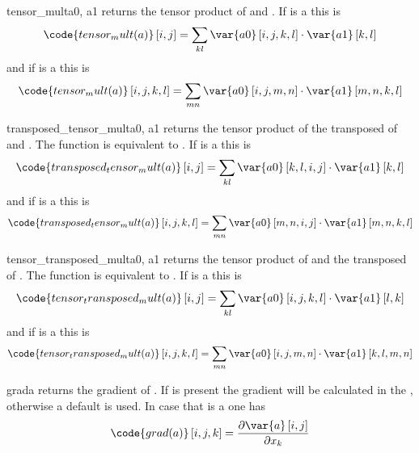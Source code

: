 \begin{funcdesc}{tensor_mult}{a0, a1}
returns the tensor product of  and .
If  is a \RankTwo this is
\begin{equation}
\code{tensor_mult(a)}\left[i,j\right]=\sum_{kl}\var{a0}\left[i,j,k,l\right] \cdot \var{a1} \left[k,l\right]
\end{equation}
and if  is a \RankFour this is
\begin{equation}
\code{tensor_mult(a)}\left[i,j,k,l\right]=\sum_{mn}\var{a0} \left[i,j,m,n\right] \cdot \var{a1} \left[m,n,k,l\right]
\end{equation}
\end{funcdesc}

\begin{funcdesc}{transposed_tensor_mult}{a0, a1}
returns the tensor product of the transposed of  and .
The function is equivalent to .
If  is a \RankTwo this is
\begin{equation}
\code{transposed_tensor_mult(a)}\left[i,j\right]=\sum_{kl}\var{a0}\left[k,l,i,j\right] \cdot \var{a1} \left[k,l\right]
\end{equation}
and if  is a \RankFour this is
\begin{equation}
\code{transposed_tensor_mult(a)}\left[i,j,k,l\right]=\sum_{mn}\var{a0} \left[m,n,i,j\right] \cdot \var{a1} \left[m,n,k,l\right]
\end{equation}
\end{funcdesc}

\begin{funcdesc}{tensor_transposed_mult}{a0, a1}
returns the tensor product of  and the transposed of .
The function is equivalent to .
If  is a \RankTwo this is
\begin{equation}
\code{tensor_transposed_mult(a)}\left[i,j\right]=\sum_{kl}\var{a0}\left[i,j,k,l\right] \cdot \var{a1} \left[l,k\right]
\end{equation}
and if  is a \RankFour this is
\begin{equation}
\code{tensor_transposed_mult(a)}\left[i,j,k,l\right]=\sum_{mn}\var{a0} \left[i,j,m,n\right] \cdot \var{a1} \left[k,l,m,n\right]
\end{equation}
\end{funcdesc}

\begin{funcdesc}{grad}{a}
returns the gradient of . If  is present the gradient will
be calculated in the \FunctionSpace {}, otherwise a default
\FunctionSpace is used. In case that  is a \RankTwo one has
\begin{equation}
\code{grad(a)}\left[i,j,k\right]=\frac{\partial \var{a} \left[i,j\right]}{\partial x_{k}}
\end{equation}
\end{funcdesc}

